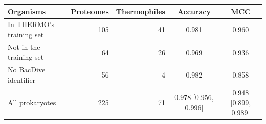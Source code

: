 \begin{tabular}{lrrcc}
\hline
\textbf{Organisms} & \textbf{Proteomes} & \textbf{Thermophiles} & \textbf{Accuracy} & \textbf{MCC} \\
\hline
In THERMO's training set & 105 & 41 & 0.981 & 0.960 \\
Not in the training set & 64 & 26 & 0.969 & 0.936 \\
No BacDive identifier & 56 & 4 & 0.982 & 0.858 \\
\hline
All prokaryotes & 225 & 71 & 0.978 {\scriptsize[0.956, 0.996]} & 0.948 {\scriptsize[0.899, 0.989]} \\
\hline
\end{tabular}

